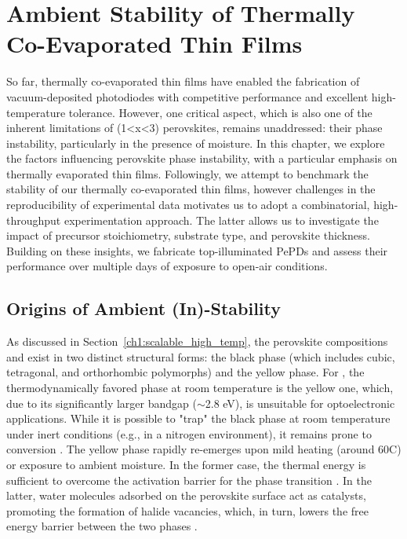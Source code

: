 \chapter{Ambient Stability of Thermally Co-Evaporated  Thin Films}\label{ch:stability}


So far, thermally co-evaporated  thin films have enabled the fabrication of vacuum-deposited photodiodes with competitive performance and excellent high-temperature tolerance. However, one critical aspect, which is also one of the inherent limitations of  (1<x<3) perovskites, remains unaddressed: their phase instability, particularly in the presence of moisture. In this chapter, we explore the factors influencing perovskite phase instability, with a particular emphasis on thermally evaporated thin films. Followingly, we attempt to benchmark the stability of our thermally co-evaporated  thin films, however challenges in the reproducibility of experimental data motivates us to adopt a combinatorial, high-throughput experimentation approach. The latter allows us to investigate the impact of precursor stoichiometry, substrate type, and perovskite thickness. Building on these insights, we fabricate top-illuminated PePDs and assess their performance over multiple days of exposure to open-air conditions.


\section{Origins of Ambient (In)-Stability}

As discussed in Section~\ref{ch1:scalable_high_temp}, the perovskite compositions  and  exist in two distinct structural forms: the black phase (which includes cubic, tetragonal, and orthorhombic polymorphs) and the yellow phase. For , the thermodynamically favored phase at room temperature is the yellow one, which, due to its significantly larger bandgap ($\sim$2.8 eV), is unsuitable for optoelectronic applications. While it is possible to "trap" the black phase at room temperature under inert conditions (e.g., in a nitrogen environment), it remains prone to conversion \cite{Steele2021TrojansPerovskite}. The yellow phase rapidly re-emerges upon mild heating (around 60\degree C) or exposure to ambient moisture. In the former case, the thermal energy is sufficient to overcome the activation barrier for the phase transition \cite{Steele2019ThermalFilms}. In the latter, water molecules adsorbed on the perovskite surface act as catalysts, promoting the formation of halide vacancies, which, in turn, lowers the free energy barrier between the two phases \cite{Dastidar2016HighIodide, Kang2017HighCsPbBr3, Lin2018ThermochromicCells, Lin2021KineticsPerovskite}. 


